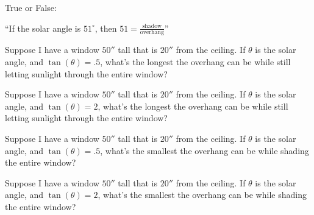 \documentclass[noauthor,nooutcomes]{ximera}
\author{Bart Snapp}
\begin{document}
\maketitle


\begin{exercise}
  True or False:

  ``If the solar angle is $51^\circ$, then $51 = \frac{\text{shadow}}{\text{overhang}}$''

  
\end{exercise}


\begin{exercise}
  Suppose I have a window $50''$ tall that is $20''$ from the
  ceiling. If $\theta$ is the solar angle, and $\tan(\theta) = .5$,
  what's the longest the overhang can be while still letting sunlight
  through the entire window?
\end{exercise}

\begin{exercise}
  Suppose I have a window $50''$ tall that is $20''$ from the ceiling.
  If $\theta$ is the solar angle, and $\tan(\theta) = 2$, what's the
  longest the overhang can be while still letting sunlight through the
  entire window?
\end{exercise}


\begin{exercise}
  Suppose I have a window $50''$ tall that is $20''$ from the ceiling.
  If $\theta$ is the solar angle, and $\tan(\theta) = .5$, what's the
  smallest the overhang can be while shading the entire window?
\end{exercise}



\begin{exercise}
  Suppose I have a window $50''$ tall that is $20''$ from the ceiling.
  If $\theta$ is the solar angle, and $\tan(\theta) = 2$, what's the
  smallest the overhang can be while shading the entire window?
\end{exercise}



\end{document}
